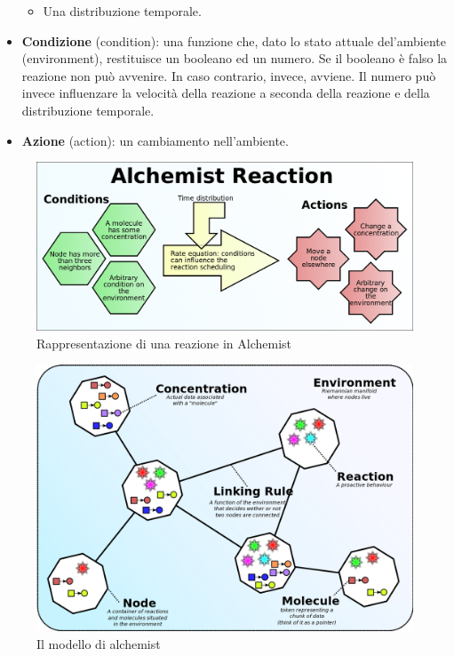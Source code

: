 \documentclass[12pt,a4paper,openright,twoside]{book}
\begin{document}
\begin{itemize}
\begin{itemize}
        \item Una distribuzione temporale.
    \end{itemize}
    \item \textbf{Condizione} (condition): una funzione che, dato lo stato attuale del’ambiente (environment), restituisce un booleano ed un numero. Se il booleano è falso la reazione non può avvenire. In caso contrario, invece, avviene. Il numero può invece influenzare la velocità della reazione a seconda della reazione e della distribuzione temporale.
    \item \textbf{Azione} (action): un cambiamento nell’ambiente.
\end{itemize}

\begin{figure}[ht]
    \centering
    \includegraphics[width=.8\linewidth]{figures/alchemistReaction.png}
    \caption{Rappresentazione di una reazione in Alchemist}
    \label{fig:reactionAlchemist}
\end{figure}
\begin{figure}[ht]
    \centering
    \includegraphics[width=.8\linewidth]{figures/alchemistModel.png}
    \caption{Il modello di alchemist}
    \label{fig:rmodelAlchemist}
\end{figure}
\clearpage
\end{document}
